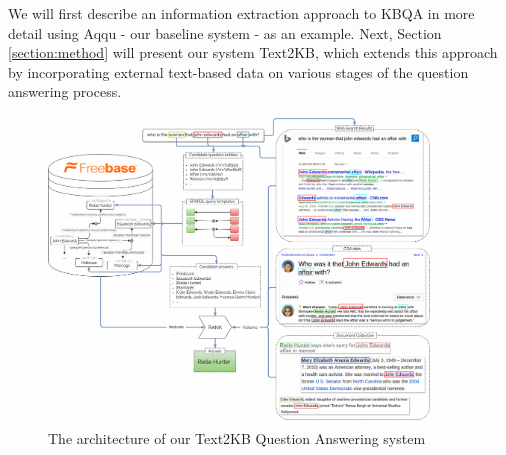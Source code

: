 
We will first describe an information extraction approach to KBQA in more detail using Aqqu - our baseline system - as an example. Next, Section \ref{section:method} will present our system Text2KB, which extends this approach by incorporating external text-based data on various stages of the question answering process.

\begin{figure}[!ht]
\centering
\includegraphics[width=0.9\textwidth]{img/Text2KB_model}
\vspace{-0.5cm}
\caption{The architecture of our Text2KB Question Answering system}
\label{fig:model}
\vspace{-0.5cm}
\end{figure}


